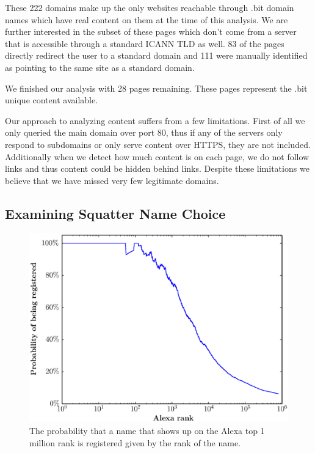 These 222 domains make up the only websites reachable through .bit domain names which have real content on them at the time of this analysis. We are further interested in the subset of these pages which don't come from a server that is accessible through a standard ICANN TLD as well.  83 of the pages directly redirect the user to a standard domain and 111 were manually identified as pointing to the same site as a standard domain.

We finished our analysis with 28 pages remaining. These pages represent the .bit unique content available.

Our approach to analyzing content suffers from a few limitations. First of all we only queried the main domain over port 80, thus if any of the servers only respond to subdomains or only serve content over HTTPS, they are not included. Additionally when we detect how much content is on each page, we do not follow links and thus content could be hidden behind links. Despite these limitations we believe that we have missed very few legitimate domains.

\subsection{Examining Squatter Name Choice}

\begin{figure}[t]
  \centering
  \includegraphics[width=\columnwidth]{figures/alexa_probability}
  \caption{The probability that a name that shows up on the Alexa top 1 million rank is registered given by the rank of the name.}
  \label{fig:alexa_probability}
\end{figure}

